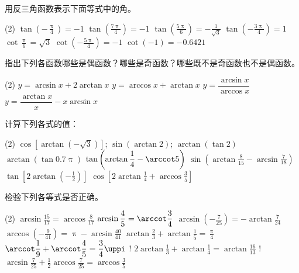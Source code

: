 \begin{Exercise}
\begin{question}
  \item 用反三角函数表示下面等式中的角。
  \begin{tasks}(2)
    \task $\displaystyle \tan\left(-\frac{\uppi}{4}\right)=-1$
    \task $\displaystyle \tan\left(\frac{7\uppi}{4}\right)=-1$
    \task $\displaystyle \tan\left(\frac{5\uppi}{6}\right)=-\frac{1}{\sqrt{3}}$
    \task $\displaystyle \tan\left(-\frac{3\uppi}{4}\right)=1$
    \task $\displaystyle \cot\frac{\uppi}{6}=\sqrt{3}$
    \task $\displaystyle \cot\left(-\frac{5\uppi}{4}\right)=-1$
    \task $\displaystyle \cot\left(-1\right)=-0.6421$
  \end{tasks}
  \item 指出下列各函数哪些是偶函数？哪些是奇函数？哪些既不是奇函数也不是偶函数。
  \begin{tasks}(2)
    \task $y=\arcsin x+2 \arctan x$
    \task $y=\arccos x+\arctan x$
    \task $y=\dfrac{\arcsin x}{\arccos x}$
    \task $y=\dfrac{\arctan x}{x}-x \arcsin x$
  \end{tasks}
  \item 计算下列各式的值：
  \begin{tasks}(2)
    \task  $\displaystyle \cos [\arctan(-\sqrt{3})]$;
    \task  $\displaystyle \sin (\arctan 2)$;
    \task  $\displaystyle \arctan(\tan2)$
    \task  $\displaystyle \arctan(\tan0.7 \uppi)$
    \task  $\displaystyle \tan\left(\arctan \frac{1}{4}-\arccot  5\right)$
    \task  $\displaystyle \sin \left(\arctan \frac{8}{15}-\arcsin \frac{7}{18}\right)$
    \task  $\displaystyle \tan\left[2 \arctan\left(-\frac{1}{2}\right)\right]$
    \task  $\displaystyle \cos \left[2 \arctan \frac{1}{4}+\arccos \frac{3}{5}\right]$
  \end{tasks}
  \item 检验下列各等式是否正确。
  \begin{tasks}(2)
    \task $\displaystyle \arcsin \frac{15}{17}=\arccos \frac{8}{17}$
    \task $\displaystyle \arcsin \frac{4}{5}=\arccot\frac{3}{4}$
    \task $\displaystyle \arcsin \left(-\frac{7}{25}\right)=-\arctan \frac{7}{24}$
    \task $\displaystyle \arccos \left(-\frac{9}{41}\right)=\uppi-\arcsin \frac{40}{41}$
    \task $\displaystyle \arctan \frac{2}{3}+\arctan \frac{1}{5}=\frac{\uppi}{4}$
    \task $\displaystyle \arccot\frac{1}{9}+\arccot\frac{4}{5}=\frac{3}{4} \uppi$
    \task! $\displaystyle 2 \arctan \frac{1}{3}+\arctan \frac{1}{4}=\arctan \frac{16}{13}$
    \task! $\displaystyle \arcsin \frac{7}{25}+\frac{1}{2} \arccos \frac{7}{25}=\arccos \frac{3}{5}$

\end{tasks}
\end{question}
\end{Exercise}
